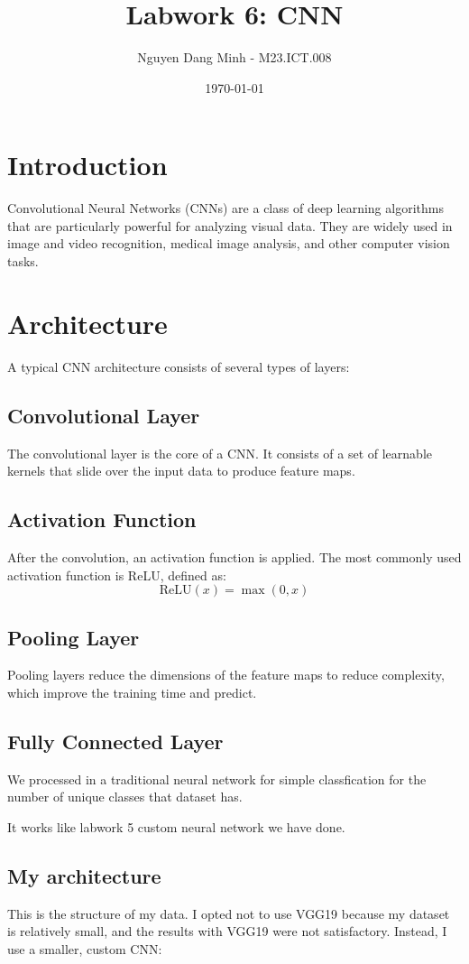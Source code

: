 \documentclass{article}
\title{Labwork 6: CNN}
\author{Nguyen Dang Minh - M23.ICT.008}
\date{\today}
\begin{document}
\maketitle

\section{Introduction}
Convolutional Neural Networks (CNNs) are a class of deep learning algorithms that are particularly powerful for analyzing visual data. They are widely used in image and video recognition, medical image analysis, and other computer vision tasks.


\section{Architecture}
A typical CNN architecture consists of several types of layers:

\subsection{Convolutional Layer}
The convolutional layer is the core of a CNN. It consists of a set of learnable kernels that slide over the input data to produce feature maps.

\subsection{Activation Function}
After the convolution, an activation function is applied. The most commonly used activation function is ReLU, defined as:
\[
\text{ReLU}(x) = \max(0, x)
\]

\subsection{Pooling Layer}
Pooling layers reduce the dimensions of the feature maps to reduce complexity, which improve the training time and predict.

\subsection{Fully Connected Layer}
We processed in a traditional neural network for simple classfication for the number of unique classes that dataset has.

It works like labwork 5 custom neural network we have done.

\subsection{My architecture }
This is the structure of my data. I opted not to use VGG19 because my dataset is relatively small, and the results with VGG19 were not satisfactory. Instead, I use a smaller, custom CNN:
\end{document}
